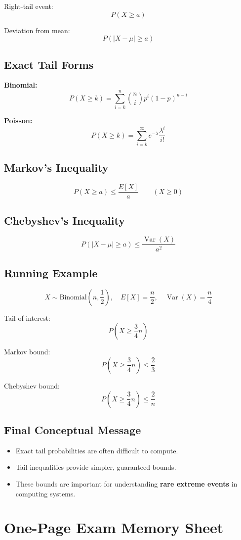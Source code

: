 \documentclass[12pt]{article}
\begin{document}
Right-tail event:
\[
P(X\ge a)
\]

Deviation from mean:
\[
P(|X-\mu|\ge a)
\]

\subsection{Exact Tail Forms}
\textbf{Binomial:}
\[
P(X \ge k)=\sum_{i=k}^{n}\binom{n}{i}p^i(1-p)^{n-i}
\]

\textbf{Poisson:}
\[
P(X \ge k)=\sum_{i=k}^{\infty} e^{-\lambda}\frac{\lambda^i}{i!}
\]

\subsection{Markov's Inequality}
\[
P(X\ge a)\le \frac{E[X]}{a}
\qquad (X\ge 0)
\]

\subsection{Chebyshev's Inequality}
\[
P(|X-\mu|\ge a)\le \frac{\operatorname{Var}(X)}{a^2}
\]

\subsection{Running Example}
\[
X\sim \text{Binomial}\left(n,\frac12\right),\quad E[X]=\frac n2,\quad \operatorname{Var}(X)=\frac n4
\]

Tail of interest:
\[
P\left(X\ge \frac34 n\right)
\]

Markov bound:
\[
P\left(X\ge \frac34 n\right)\le \frac23
\]

Chebyshev bound:
\[
P\left(X\ge \frac34 n\right)\le \frac2n
\]

\subsection{Final Conceptual Message}
\begin{itemize}[leftmargin=1.5em]
    \item Exact tail probabilities are often difficult to compute.
    \item Tail inequalities provide simpler, guaranteed bounds.
    \item These bounds are important for understanding \textbf{rare extreme events} in computing systems.
\end{itemize}

\section{One-Page Exam Memory Sheet}
\end{document}
